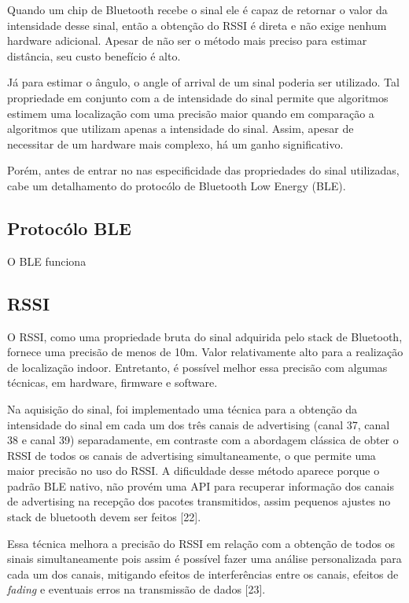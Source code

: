 Quando um chip de Bluetooth recebe o sinal ele é capaz de retornar o valor da intensidade desse sinal, então a obtenção do RSSI é direta e não exige nenhum hardware adicional. Apesar de não ser o método mais preciso para estimar distância, seu custo benefício é alto.

Já para estimar o ângulo, o angle of arrival de um sinal poderia ser utilizado. Tal propriedade em conjunto com a de intensidade do sinal permite que algoritmos estimem uma localização com uma precisão maior quando em comparação a algoritmos que utilizam apenas a intensidade do sinal. Assim, apesar de necessitar de um hardware mais complexo, há um ganho significativo.

Porém, antes de entrar no nas especificidade das propriedades do sinal utilizadas, cabe um detalhamento do protocólo de Bluetooth Low Energy (BLE). 
\subsection{Protocólo BLE}

O BLE funciona

\subsection{RSSI}
O RSSI, como uma propriedade bruta do sinal adquirida pelo stack de Bluetooth, fornece uma precisão de menos de 10m. Valor relativamente alto para a realização de localização indoor. Entretanto, é possível melhor essa precisão com algumas técnicas, em hardware, firmware e software.

Na aquisição do sinal, foi implementado uma técnica para a obtenção da intensidade do sinal em cada um dos três canais de advertising (canal 37, canal 38 e canal 39) separadamente, em contraste com a abordagem clássica de obter o RSSI de todos os canais de advertising simultaneamente, o que permite uma maior precisão no uso do RSSI. A dificuldade desse método aparece porque o padrão BLE nativo, não provém uma API para recuperar informação dos canais de advertising na recepção dos pacotes transmitidos, assim pequenos ajustes no stack de bluetooth devem ser feitos [22].

Essa técnica melhora a precisão do RSSI em relação com a obtenção de todos os sinais simultaneamente pois assim é possível fazer uma análise personalizada para cada um dos canais, mitigando efeitos de interferências entre os canais, efeitos de \textit {fading} e eventuais erros na transmissão de dados [23].

